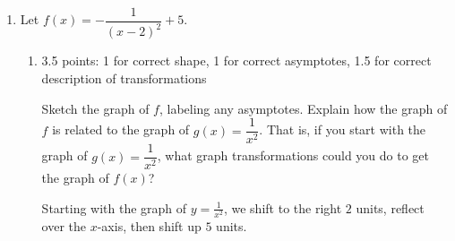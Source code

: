 \documentclass{article}
\begin{document}
\begin{enumerate}
\begin{enumerate}
    \begin{solution}
      To find the formula for $f^{-1}(x)$ algebraically, we start with
      $y = f(x)$, switch $x$ and $y$, and then solve for $y$. 
      \begin{enumerate}
      \item
        \begin{align*}
          x &= 2y + 1 \\
          x - 1 &= 2y \\
          y &= \frac{x - 1}{2} \\
          f^{-1}(x) &= \boxed{\frac{x - 1}{2}}
        \end{align*}
      \item 
        \begin{align*}
          (y-1)^2 -2 &= x \\
          (y-1)^2 &= x+2 \\
          y-1 &= \sqrt{x+2} \\
          y &= \sqrt{x+2} + 1 \\
          f^{-1}(x) &= \boxed{\sqrt{x+2} + 1}
        \end{align*}
      \end{enumerate}
    \end{solution}

  \end{enumerate}

\item 

  Let $f(x) = -\dfrac{1}{(x - 2)^2} + 5$.

  \begin{enumerate}
  \item

    \begin{grading}
      3.5 points: 1 for correct shape, 1 for correct asymptotes, 1.5 for correct description of transformations 
    \end{grading}

    \begin{problem}[\vfill]
      Sketch the graph of $f$, labeling any asymptotes. Explain how the graph of $f$ is related to the graph of $g(x) = \dfrac{1}{x^2}$. That is, if you start with the graph of $g(x) = \dfrac{1}{x^2}$, what graph transformations could you do to get the graph of $f(x)$?
    \end{problem}

    \begin{solution}
      Starting with the graph of $y=\frac{1}{x^2}$, we shift to the right $2$ units,
      reflect over the $x$-axis, then shift up $5$ units.


\end{solution}
\end{enumerate}
\end{enumerate}
\end{document}
